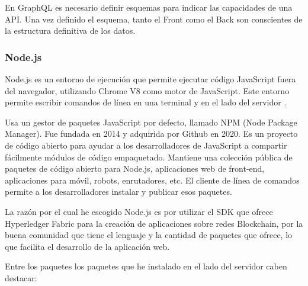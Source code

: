 \vspace{5mm}

\noindent En GraphQL es necesario definir esquemas para indicar las capacidades de una API. Una vez definido el esquema, 
tanto el Front como el Back son conscientes de la estructura definitiva de los datos.

\subsubsection*{Node.js}

Node.js es un entorno de ejecución que permite ejecutar código JavaScript fuera del navegador, utilizando Chrome V8 
como motor de JavaScript. Este entorno permite escribir comandos de línea en una terminal y  en el lado 
del servidor \cite{what-is-nodejs}.

\vspace{5mm}

\noindent Usa un gestor de paquetes JavaScript por defecto, llamado NPM (Node Package Manager). Fue fundada en 2014 y
adquirida por Github en 2020. Es un proyecto de código abierto para ayudar a los desarrolladores de JavaScript a
compartir fácilmente módulos de código empaquetado. Mantiene una colección pública de paquetes de código abierto
para Node.js, aplicaciones web de front-end, aplicaciones para móvil, robots, enrutadores, etc. El cliente de línea 
de comandos permite a los desarrolladores instalar y publicar esos paquetes.

\vspace{5mm}

\noindent La razón por el cual he escogido Node.js es por utilizar el SDK que ofrece Hyperledger Fabric para la 
creación de aplicaciones sobre redes Blockchain, por la buena comunidad que tiene el lenguaje y la cantidad de 
paquetes que ofrece, lo que facilita el desarrollo de la aplicación web.

\vspace{5mm}

\noindent Entre los paquetes los paquetes que he instalado en el lado del servidor caben destacar:


